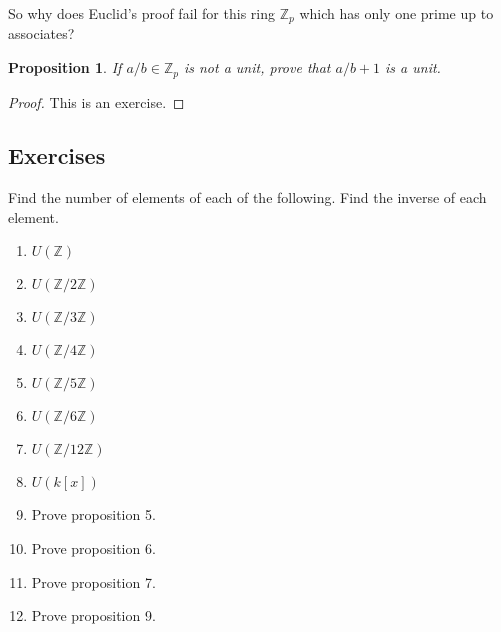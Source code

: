 \documentclass{article}
\theoremstyle{problemstyle}
\newtheorem{proposition}{Proposition}
\begin{document}
So why does Euclid's proof fail for this ring $\mathbb{Z}_p$ which has only one prime up to associates? 

\begin{proposition}
If $a/b \in \mathbb{Z}_p$ is not a unit, prove that $a/b + 1$ is a unit. 
\end{proposition}

\begin{proof}
This is an exercise. 
\end{proof}

\subsection*{Exercises}

Find the number of elements of each of the following. Find the inverse of each element. 
\begin{enumerate}
\item $U(\mathbb{Z})$
\item $U(\mathbb{Z}/2\mathbb{Z})$
\item $U(\mathbb{Z}/3\mathbb{Z})$
\item $U(\mathbb{Z}/4\mathbb{Z})$
\item $U(\mathbb{Z}/5\mathbb{Z})$
\item $U(\mathbb{Z}/6\mathbb{Z})$
\item $U(\mathbb{Z}/12\mathbb{Z})$
\item $U(k[x])$
\item Prove proposition 5. 
\item Prove proposition 6. 
\item Prove proposition 7. 
\item Prove proposition 9.
\end{enumerate}
\end{document}
